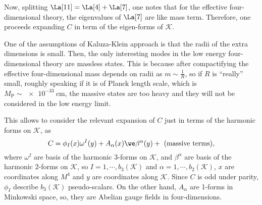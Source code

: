 Now, splitting $\La[11] = \La[4] + \La[7]$, one notes that for the effective four-dimensional theory, the eigenvalues of $\La[7]$ are like  mass term. Therefore, one proceeds  expanding $C$ in term of the eigen-forms of $\mathcal{K}$.

One of the  assumptions of Kaluza-Klein approach is that %
the radii of the extra dimensions is small. Then, the only interesting modes in the low energy four-dimensional theory are  massless states. This is because after compactifying the effective four-dimensional mass depends on radii as $m \sim \frac{1}{R}$, so if $R$ is ``really'' small, roughly speaking if it is of Planck length scale, which is $M_{\text{P}} \sim \SI{e-33}{\cm}$, the massive states are too heavy and they will not be considered in the low energy limit.

This allows  to consider the relevant expansion of $C$ just in terms of the harmonic forms on $\mathcal{K}$, as 
\begin{equation}
  C = \phi_I(x) \omega^I(y) + A_\alpha(x) \we \beta^\alpha(y) + \text{ (massive terms)},
\end{equation}
where $\omega^I$ are basis of the harmonic $3$-forms on $\mathcal{K}$, and $\beta^\alpha$ are basis of the harmonic $2$-forms on $\mathcal{K}$, so $I = 1, \cdots, b_3(\mathcal{K})$ and $\alpha = 1, \cdots, b_2(\mathcal{K})$, $x$ are coordinates along $M^4$ and $y$ are coordinates along $\mathcal{K}$. Since $C$ is odd under parity, $\phi_I$ describe $b_3(\mathcal{K})$ pseudo-scalars. On the other hand, $A_\alpha$ are  1-forms in Minkowski space, so, they are Abelian gauge fields in four-dimensions.
